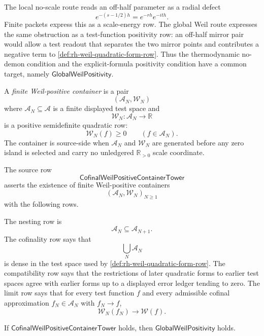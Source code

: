 \begin{principle}
\label{prin:rh-weil-positivity-no-scale-global-target}
The local no-scale route reads an off-half parameter as a radial defect
$$
e^{-(s-1/2)h}=e^{-rh}e^{-ith}.
$$
Finite packets express this as a scale-energy row.  The global Weil
route expresses the same obstruction as a test-function positivity row:
an off-half mirror pair would allow a test readout that separates the two
mirror points and contributes a negative term to
\autoref{def:rh-weil-quadratic-form-row}.  Thus the thermodynamic
no-demon condition and the explicit-formula positivity condition have a
common target, namely $\mathsf{GlobalWeilPositivity}$.
\end{principle}

\begin{definition}
\label{def:rh-finite-weil-positive-container}
A \emph{finite Weil-positive container} is a pair
$$
(\mathcal A_N,\mathcal W_N)
$$
where $\mathcal A_N\subseteq\mathcal A$ is a finite displayed
test space and
$$
\mathcal W_N:\mathcal A_N\to\mathbb R
$$
is a positive semidefinite quadratic row:
$$
\mathcal W_N(f)\ge0
\qquad
(f\in\mathcal A_N).
$$
The container is source-side when $\mathcal A_N$ and $\mathcal W_N$ are
generated before any zero island is selected and carry no unledgered
$\mathbb R_{>0}$ scale coordinate.
\end{definition}

\begin{definition}
\label{def:rh-cofinal-weil-positive-container-tower}
The source row
$$
\mathsf{CofinalWeilPositiveContainerTower}
$$
asserts the existence of finite Weil-positive containers
$$
(\mathcal A_N,\mathcal W_N)_{N\ge1}
$$
with the following rows.

The nesting row is
$$
\mathcal A_N\subseteq\mathcal A_{N+1}.
$$
The cofinality row says that
$$
\bigcup_N\mathcal A_N
$$
is dense in the test space used by
\autoref{def:rh-weil-quadratic-form-row}.  The compatibility row says
that the restrictions of later quadratic forms to earlier test spaces
agree with earlier forms up to a displayed error ledger tending to zero.
The limit row says that for every test function $f$ and every admissible
cofinal approximation $f_N\in\mathcal A_N$ with $f_N\to f$,
$$
\mathcal W_N(f_N)\to\mathcal W(f).
$$
\end{definition}

\begin{theorem}
\label{thm:rh-cofinal-weil-positive-tower-gives-global-positivity}
If $\mathsf{CofinalWeilPositiveContainerTower}$ holds, then
$\mathsf{GlobalWeilPositivity}$ holds.
\end{theorem}


